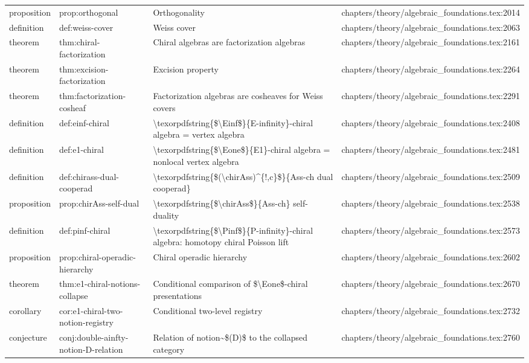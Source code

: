 \documentclass[11pt]{article}
\begin{document}
\begin{longtable}{L{0.10\textwidth}L{0.26\textwidth}L{0.42\textwidth}L{0.22\textwidth}}
proposition & prop:orthogonal & Orthogonality & chapters/theory/algebraic\_foundations.tex:2014\\
definition & def:weiss-cover & Weiss cover & chapters/theory/algebraic\_foundations.tex:2063\\
theorem & thm:chiral-factorization & Chiral algebras are factorization algebras & chapters/theory/algebraic\_foundations.tex:2161\\
theorem & thm:excision-factorization & Excision property & chapters/theory/algebraic\_foundations.tex:2264\\
theorem & thm:factorization-cosheaf & Factorization algebras are cosheaves for Weiss covers & chapters/theory/algebraic\_foundations.tex:2291\\
definition & def:einf-chiral & \textbackslash{}texorpdfstring\{\$\textbackslash{}Einf\$\}\{E-infinity\}-chiral algebra = vertex algebra & chapters/theory/algebraic\_foundations.tex:2408\\
definition & def:e1-chiral & \textbackslash{}texorpdfstring\{\$\textbackslash{}Eone\$\}\{E1\}-chiral algebra = nonlocal vertex algebra & chapters/theory/algebraic\_foundations.tex:2481\\
definition & def:chirass-dual-cooperad & \textbackslash{}texorpdfstring\{\$(\textbackslash{}chirAss)\textasciicircum{}\{!,c\}\$\}\{Ass-ch dual cooperad\} & chapters/theory/algebraic\_foundations.tex:2509\\
proposition & prop:chirAss-self-dual & \textbackslash{}texorpdfstring\{\$\textbackslash{}chirAss\$\}\{Ass-ch\} self-duality & chapters/theory/algebraic\_foundations.tex:2538\\
definition & def:pinf-chiral & \textbackslash{}texorpdfstring\{\$\textbackslash{}Pinf\$\}\{P-infinity\}-chiral algebra: homotopy chiral Poisson lift & chapters/theory/algebraic\_foundations.tex:2573\\
proposition & prop:chiral-operadic-hierarchy & Chiral operadic hierarchy & chapters/theory/algebraic\_foundations.tex:2602\\
theorem & thm:e1-chiral-notions-collapse & Cond{}itional comparison of \$\textbackslash{}Eone\$-chiral presentations & chapters/theory/algebraic\_foundations.tex:2670\\
corollary & cor:e1-chiral-two-notion-registry & Cond{}itional two-level registry & chapters/theory/algebraic\_foundations.tex:2732\\
conjecture & conj:double-ainfty-notion-D-relation & Relation of notion\textasciitilde{}\$(D)\$ to the collapsed category & chapters/theory/algebraic\_foundations.tex:2760\\

\end{longtable}
\end{document}
